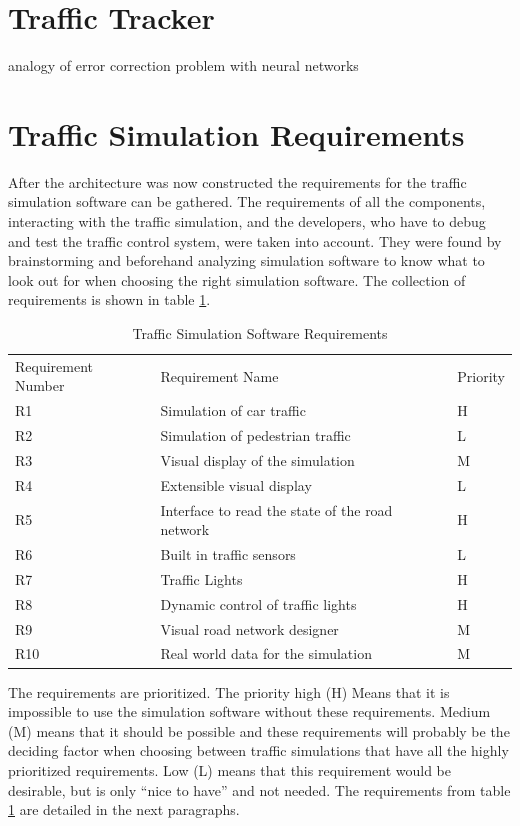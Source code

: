 \section{Traffic Tracker}
\label{trafficTracker}

analogy of error correction problem with neural networks

\section{Traffic Simulation Requirements}
\label{trafficSimulationRequirements}

After the architecture was now constructed the requirements for the traffic simulation software can be gathered. The requirements of all the components, interacting with the traffic simulation, and the developers, who have to debug and test the traffic control system, were taken into account. They were found by brainstorming and beforehand analyzing simulation software to know what to look out for when choosing the right simulation software. The collection of requirements is shown in table \ref{simulationRequirements}.

\begin{table}[!ht]
  	\centering
  	\begin{tabular}{lll}
		Requirement Number & Requirement Name & Priority \\[10pt]
		R1 & Simulation of car traffic & H \\[10pt]
		R2 & Simulation of pedestrian traffic & L \\[10pt]
		R3 & Visual display of the simulation & M \\[10pt]
		R4 & Extensible visual display & L \\[10pt]
		R5 & Interface to read the state of the road network & H \\[10pt]
		R6 & Built in traffic sensors & L \\[10pt]
		R7 & Traffic Lights & H \\[10pt]
		R8 & Dynamic control of traffic lights & H \\[10pt]
		R9 & Visual road network designer & M \\[10pt]
		R10 & Real world data for the simulation & M \\[10pt]
	\end{tabular}
  	\caption{Traffic Simulation Software Requirements}
  	\label{simulationRequirements}
\end{table}

The requirements are prioritized. The priority high (H) Means that it is impossible to use the simulation software without these requirements. Medium (M) means that it should be possible and these requirements will probably be the deciding factor when choosing between traffic simulations that have all the highly prioritized requirements. Low (L) means that this requirement would be desirable, but is only ``nice to have'' and not needed. The requirements from table \ref{simulationRequirements} are detailed in the next paragraphs.

